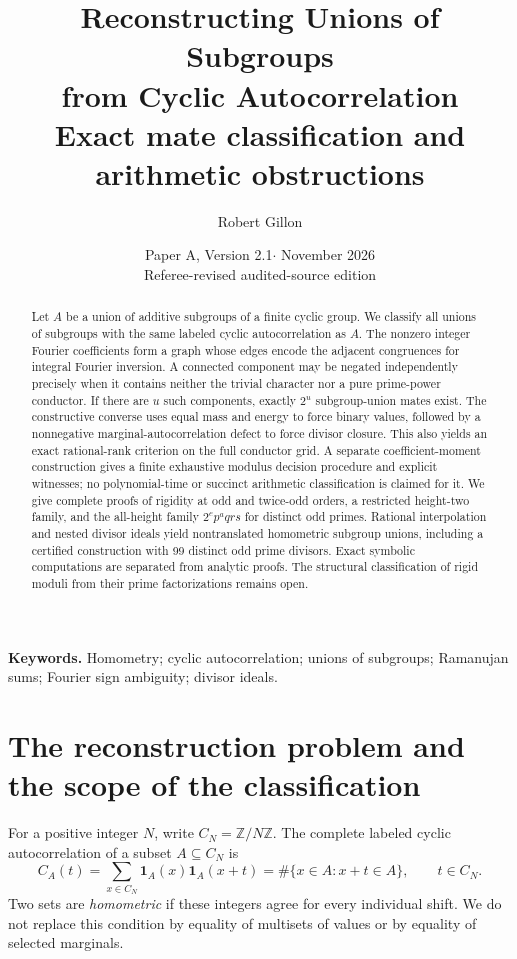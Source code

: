\documentclass[11pt]{article}
\title{Reconstructing Unions of Subgroups\protect\\from Cyclic Autocorrelation\protect\\[.35em]\large Exact mate classification and arithmetic obstructions}
\author{Robert Gillon}
\date{Paper A, Version 2.1\enspace $\cdot$\enspace 22 November 2026\protect\\\small Referee-revised audited-source edition}
\numberwithin{equation}{section}
\theoremstyle{definition}
\theoremstyle{remark}
\newcommand{\Z}{\mathbb Z}
\newcommand{\ind}{\mathbf1}
\begin{document}
\maketitle
\begin{abstract}
Let $A$ be a union of additive subgroups of a finite cyclic group. We classify all unions of subgroups with the same labeled cyclic autocorrelation as $A$. The nonzero integer Fourier coefficients form a graph whose edges encode the adjacent congruences for integral Fourier inversion. A connected component may be negated independently precisely when it contains neither the trivial character nor a pure prime-power conductor. If there are $u$ such components, exactly $2^u$ subgroup-union mates exist. The constructive converse uses equal mass and energy to force binary values, followed by a nonnegative marginal-autocorrelation defect to force divisor closure. This also yields an exact rational-rank criterion on the full conductor grid. A separate coefficient-moment construction gives a finite exhaustive modulus decision procedure and explicit witnesses; no polynomial-time or succinct arithmetic classification is claimed for it. We give complete proofs of rigidity at odd and twice-odd orders, a restricted height-two family, and the all-height family $2^e p^a qrs$ for distinct odd primes. Rational interpolation and nested divisor ideals yield nontranslated homometric subgroup unions, including a certified construction with 99 distinct odd prime divisors. Exact symbolic computations are separated from analytic proofs. The structural classification of rigid moduli from their prime factorizations remains open.
\end{abstract}
\vspace{.5em}
\noindent\textbf{Keywords.} Homometry; cyclic autocorrelation; unions of subgroups; Ramanujan sums; Fourier sign ambiguity; divisor ideals.
\clearpage
\setcounter{tocdepth}{1}
\tableofcontents
\clearpage

\section{The reconstruction problem and the scope of the classification}\label{v2:sec:intro}
For a positive integer $N$, write $C_N=\Z/N\Z$. The complete labeled cyclic autocorrelation of a subset $A\subseteq C_N$ is
\begin{equation}\label{ii:eq:corr}
 C_A(t)=\sum_{x\in C_N}\ind_A(x)\ind_A(x+t)
       =\#\{x\in A:x+t\in A\},\qquad t\in C_N.
\end{equation}
Two sets are \emph{homometric} if these integers agree for every individual shift. We do not replace this condition by equality of multisets of values or by equality of selected marginals.
\end{document}
